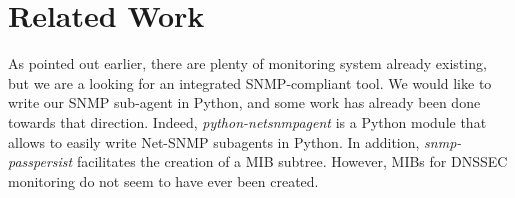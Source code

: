\section{Related Work}
\label{chap:related_work}
As pointed out earlier, there are plenty of monitoring system already existing\cite{list}, but we are a looking for an integrated SNMP-compliant tool. We would like to write our SNMP sub-agent in Python, and some work has already been done towards that direction. Indeed, \textit{python-netsnmpagent}\cite{pythonnetsnmpagent} is a Python module that allows to easily write Net-SNMP subagents in Python. In addition, \textit{snmp-passpersist}\cite{passpersist} facilitates the creation of a MIB subtree. However, MIBs for DNSSEC monitoring do not seem to have ever been created. 
